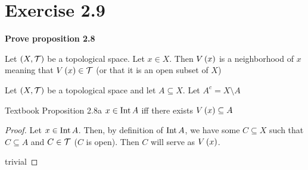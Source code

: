 \documentclass{article}
\begin{document}
\section{Exercise 2.9}

\textbf{Prove proposition 2.8}

\begin{definition}
    \label{def:nbhd}
    Let $(X, \mathcal{T})$ be a topological space. Let $x \in X$. Then $V\left(x\right)$ is a neighborhood
    of $x$ meaning that $V\left(x\right) \in \mathcal{T}$ (or that it is an open subset of $X$)
\end{definition}

Let $(X, \mathcal{T})$ be a topological space and let $A \subseteq X$. Let $A^c = X \setminus A$

\begin{proposition}{Textbook Proposition 2.8a}
\label{book:prop:2.8a}
    $x \in \textnormal{Int} \, A$ iff there exists $V\left(x\right) \subseteq A$
\end{proposition}
\begin{proof}
    \forwarddir Let $x \in \textnormal{Int} \, A$. Then, by definition of $\textnormal{Int} \, A$, we have some
    $C \subseteq X$ such that $C \subseteq A$ and $C \in \mathcal{T}$ ($C$ is open). Then $C$ will
    serve as $V\left(x\right)$.

    \conversedir trivial
\end{proof}
\end{document}
